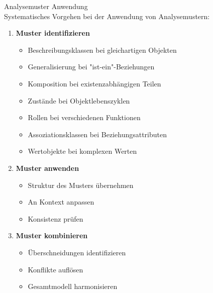 \begin{KR}{Analysemuster Anwendung}\\
Systematisches Vorgehen bei der Anwendung von Analysemustern:
\begin{enumerate}
    \item \textbf{Muster identifizieren}
    \begin{itemize}
        \item Beschreibungsklassen bei gleichartigen Objekten
        \item Generalisierung bei "ist-ein"-Beziehungen
        \item Komposition bei existenzabhängigen Teilen
        \item Zustände bei Objektlebenszyklen
        \item Rollen bei verschiedenen Funktionen
        \item Assoziationsklassen bei Beziehungsattributen
        \item Wertobjekte bei komplexen Werten
    \end{itemize}
    
    \item \textbf{Muster anwenden}
    \begin{itemize}
        \item Struktur des Musters übernehmen
        \item An Kontext anpassen
        \item Konsistenz prüfen
    \end{itemize}
    
    \item \textbf{Muster kombinieren}
    \begin{itemize}
        \item Überschneidungen identifizieren
        \item Konflikte auflösen
        \item Gesamtmodell harmonisieren
    \end{itemize}
\end{enumerate}
\end{KR}

